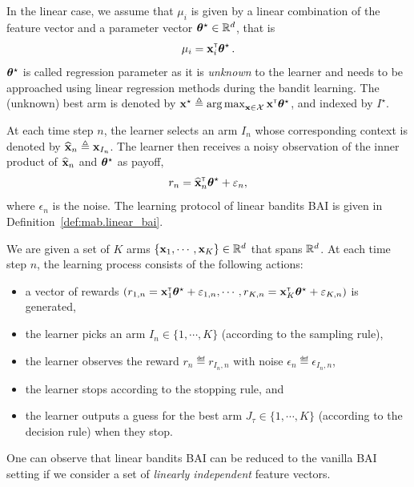 In the linear case, we assume that $\mu_i$ is given by a linear combination of the feature vector and a parameter vector ${\boldsymbol \theta}^\star\in\mathbb{R}^d$, that is 
\[
\mu_i = {\bf x}_i^\mathsf{\scriptscriptstyle T}{\boldsymbol \theta}^\star\,.
\]
${\boldsymbol \theta}^\star$ is called regression parameter as it is \emph{unknown} to the learner and needs to be approached using linear regression methods during the bandit learning. The (unknown) best arm is denoted by ${\bf x}^\star\triangleq\operatorname*{arg\,max}_{{\bf x}\in\mathcal{X}}{\bf x}^\mathsf{\scriptscriptstyle T}{\boldsymbol \theta}^\star$, and indexed by $I^\star$.

At each time step $n$, the learner selects an arm $I_n$ whose corresponding context is denoted by $\widehat{{\bf x}}_n\triangleq {\bf x}_{I_n}$. The learner then receives a noisy observation of the inner product of $\widehat{{\bf x}}_n$ and ${\boldsymbol \theta}^\star$ as payoff,
\[
    r_n = \widehat{{\bf x}}_n^\mathsf{\scriptscriptstyle T}{\boldsymbol \theta}^\star + \varepsilon_n,
\]
where $\epsilon_n$ is the noise. The learning protocol of linear bandits BAI is given in Definition~\ref{def:mab.linear_bai}.

\begin{definition}\label{def:mab.linear_bai}
\begin{leftbar}[defnbar]
	We are given a set of $K$ arms $\{{\bf x}_1,\cdots,{\bf x}_K\}\in\mathbb{R}^d$ that spans $\mathbb{R}^d$. At each time step $n$, the learning process consists of the following actions:
\begin{itemize}
	\item a vector of rewards $(r_{1,n} = {\bf x}_1^\mathsf{\scriptscriptstyle T}{\boldsymbol \theta}^\star+\varepsilon_{1,n}, \cdots, r_{K,n} = {\bf x}_K^\mathsf{\scriptscriptstyle T}{\boldsymbol \theta}^\star+\varepsilon_{K,n})$ is generated,
	\item the learner picks an arm $I_n \in \{1,\cdots,K\}$ (according to the sampling rule),
	\item the learner observes the reward $r_n \eqdef r_{I_n, n}$ with noise $\epsilon_n \eqdef \epsilon_{I_n,n}$,
	\item the learner stops according to the stopping rule, and
	\item the learner outputs a guess for the best arm $J_\tau \in \{1,\cdots,K\}$ (according to the decision rule) when they stop.
\end{itemize}
\end{leftbar}
\end{definition}

\begin{remark}\label{remark:mab.reduction}
\begin{leftbar}[remarkbar]
    One can observe that linear bandits BAI can be reduced to the vanilla BAI setting if we consider a set of \emph{linearly independent} feature vectors.
\end{leftbar}
\end{remark}

